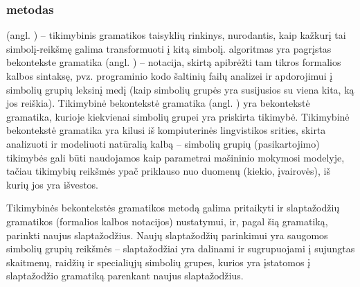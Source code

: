\documentclass{VUMIFInfBakalaurinis}
\begin{document}
\subsubsection{ metodas}
 (angl. ) -- 
tikimybinis gramatikos taisyklių rinkinys, nurodantis, kaip kažkurį tai 
simbolį-reikšmę galima transformuoti į kitą simbolį.  algoritmas 
yra pagrįstas bekontekste gramatika (angl. ) -- 
notacija, skirtą apibrėžti tam tikros formalios kalbos sintaksę, pvz. 
programinio kodo šaltinių failų analizei ir apdorojimui į simbolių grupių 
leksinį medį (kaip simbolių grupės yra susijusios su viena kita, ką jos 
reiškia). Tikimybinė bekontekstė gramatika (angl. ) yra bekontekstė gramatika, kurioje kiekvienai simbolių 
grupei yra priskirta tikimybė. Tikimybinė bekontekstė gramatika yra kilusi iš 
kompiuterinės lingvistikos srities, skirta analizuoti ir modeliuoti natūralią 
kalbą -- simbolių grupių (pasikartojimo) tikimybės gali būti naudojamos kaip 
parametrai mašininio mokymosi modelyje, tačiau tikimybių reikšmės ypač priklauso 
nuo duomenų (kiekio, įvairovės), iš kurių jos yra išvestos.

Tikimybinės bekontekstės gramatikos metodą galima pritaikyti ir slaptažodžių 
gramatikos (formalios kalbos notacijos) nustatymui, ir, pagal šią gramatiką, 
parinkti naujus slaptažodžius. Naujų slaptažodžių parinkimui yra saugomos 
simbolių grupių reikšmės -- slaptažodžiai yra dalinami ir sugrupuojami į 
sujungtas skaitmenų, raidžių ir specialiųjų simbolių grupes, kurios yra 
įstatomos į slaptažodžio gramatiką parenkant naujus slaptažodžius.
\end{document}

